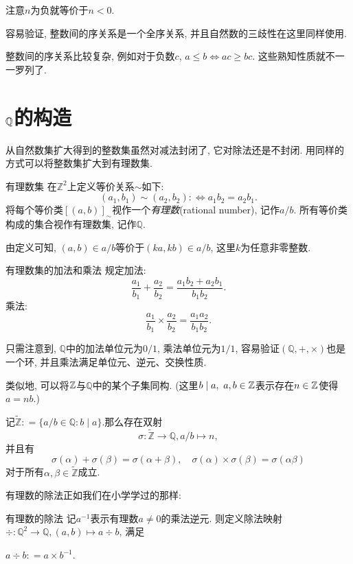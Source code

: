 注意$n$为负就等价于$n<0$.

容易验证, 整数间的序关系是一个全序关系, 并且自然数的三歧性在这里同样使用.

整数间的序关系比较复杂, 例如对于负数$c$, $a \leq b \Leftrightarrow ac \geq bc$. 这些熟知性质就不一一罗列了.

\newpage
\section{$\mathbb{Q}$的构造}

从自然数集扩大得到的整数集虽然对减法封闭了, 它对除法还是不封闭. 用同样的方式可以将整数集扩大到有理数集.

\begin{definition}{有理数集}
	在$\mathbb{Z}^2$上定义等价关系$\sim$如下: $$(a_1, b_1) \sim (a_2, b_2) : \Leftrightarrow a_1b_2=a_2b_1.$$
	将每个等价类$[(a, b)]_{\sim}$视作一个\textit{有理数}(rational number), 记作$a/b$. 所有等价类构成的集合视作有理数集, 记作$\mathbb{Q}$.
\end{definition}

由定义可知, $(a, b)\in a/b$等价于$(ka, kb) \in a/b$, 这里$k$为任意非零整数. 

\begin{definition}{有理数集的加法和乘法}
	规定加法: $$\frac{a_1}{b_1} + \frac{a_2}{b_2} = \frac{a_1b_2+a_2b_1}{b_1b_2}.$$
	乘法: 
	$$\frac{a_1}{b_1} \times \frac{a_2}{b_2} = \frac{a_1a_2}{b_1b_2}.$$
\end{definition}

只需注意到, $\mathbb{Q}$中的加法单位元为$0/1$, 乘法单位元为$1/1$, 容易验证$(\mathbb{Q}, + ,\times )$也是一个环, 并且乘法满足单位元、逆元、交换性质.

类似地, 可以将$\mathbb{Z}$与$\mathbb{Q}$中的某个子集同构. (这里$b \mid a, ~a, b \in \mathbb{Z}$表示存在$n \in \mathbb{Z}$使得$a=nb$.)

\begin{proposition}{}
	记$\tilde{\mathbb{Z}}: =\{ a/b \in \mathbb{Q}: b \mid a \}$.那么存在双射$$\sigma : \tilde{\mathbb{Z}} \to \mathbb{Q}, a/b \mapsto n, $$
	并且有$$\sigma (\alpha) + \sigma (\beta) = \sigma (\alpha + \beta), \quad \sigma (\alpha) \times \sigma (\beta) = \sigma (\alpha  \beta)$$
	对于所有$\alpha , \beta \in \tilde{\mathbb{Z}}$成立.
\end{proposition}

有理数的除法正如我们在小学学过的那样: 

\begin{definition}{有理数的除法}
	记$a^{-1}$表示有理数$a\neq 0$的乘法逆元. 则定义除法映射$\div : \mathbb{Q} ^2 \to \mathbb{Q} , (a, b) \mapsto a \div b$, 满足
	\begin{center}
		$a \div b: =a\times b^{-1}$. 
	\end{center}
\end{definition}

